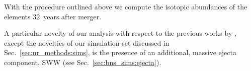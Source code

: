 









With the procedure outlined above we compute the isotopic abundances of 
the \rproc{} elements $32$~years after merger. 

A particular novelty of our analysis with respect to the previous works by
\citet{Radice:2016dwd,Radice:2018pdn}, except the novelties of our simulation set 
discussed in Sec.~\ref{sec:nr_methods:sims}, is the presence of an additional, massive 
ejecta component, \ac{SWW} (see Sec.~\ref{sec:bns_sims:ejecta}).

